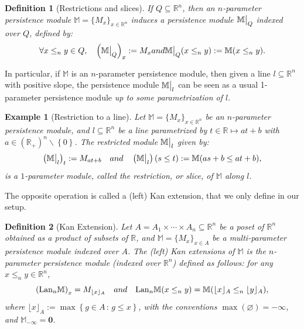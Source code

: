 \documentclass{article}
\newcommand{\R}{\mathbb{R}}
\newcommand{\Mbb}{\mathbb{M}}
\newcommand{\leqn}{\leq_n}
\newcommand\restr[2]{{  \left.\kern-\nulldelimiterspace #1 \vphantom{\big|} \right|_{#2}  }}
\newtheorem{example}{Example}%
\newtheorem{definition}{Definition}%
\newcommand{\rebuttal}[1]{{ #1}}
\begin{document}
\rebuttal{
	\begin{definition}[Restrictions and slices]\label{remark:restrictions_and_slices}
		If  $Q\subseteq \R^n$, then an $n$-parameter persistence module $\Mbb=\{M_x\}_{x\in\R^n}$ induces a persistence module $\restr \Mbb Q$ indexed over $Q$, defined by:
		\begin{equation*}
			\forall x\leqn y \in Q, \quad \left(\restr \Mbb {Q}\right)_x := M_x \textnormal{
			and } \restr \Mbb Q (x \leqn y) := \Mbb(x\leqn y).
		\end{equation*}
	\end{definition}

	In particular, if $\Mbb$ is an $n$-parameter persistence module, then given a
	line $l\subseteq \R^n$ with positive slope, the persistence module $\restr \Mbb l$ can be seen as a usual 1-parameter persistence module \emph{up to some parametrization of $l$}.
	\\

	\begin{example}[Restriction to a line]\label{ex:restr_line_mp}
		Let $\Mbb=\{M_x\}_{x\in\R^n}$ be an $n$-parameter persistence module, and $l\subseteq \R^n$ be a line
		parametrized by $t\in \R\mapsto at+b$ with $a\in (\R_+)^n
		\backslash \left\{ 0 \right\} $.
		The restricted module $\restr \Mbb l$ given by:
		\begin{equation}
			\left( \restr \Mbb l \right) _t := M_{at+b} \quad \textnormal{and }\quad
			\left( \restr \Mbb l \right)(s\le t) := \Mbb(as+b \le at+b),
		\end{equation}
		is a $1$-parameter module, called the {\em restriction, or slice, of $\Mbb$ along $l$}.  \\
	\end{example}

	The opposite operation is called a (left) Kan extension, that we only define in
	our setup. \\

	\begin{definition}[Kan Extension]\label{def:kan_extension}
		Let $A = A_1\times \cdots \times A_n \subseteq \R^n$ be a poset of $\R^n$ obtained as a
		product of subsets of $\R$, and $\Mbb=\{M_x\}_{x\in A}$ be a multi-parameter persistence module indexed over $A$.
		The \emph{(left) Kan extensions} of $\Mbb$  is the
		$n$-parameter persistence module (indexed over $\R^n$)
		defined as follows:
		for any $x\leqn y \in \R^n$,
		\begin{equation}
			\left( \mathrm{Lan}_n \Mbb \right)_x = M_{\lfloor x\rfloor_A}
			\quad
			\textnormal{and}
			\quad
			\mathrm{Lan}_n \Mbb (x\leqn y) = \Mbb(\lfloor x\rfloor_A\leqn \lfloor y\rfloor_A),
		\end{equation}
		where $\lfloor x \rfloor_A := \max \left\{ g\in A \,:\, g \le x \right\} $, with the conventions $\max (\varnothing) = -\boldsymbol \infty$, and $\Mbb_{-\boldsymbol\infty} = \boldsymbol 0$.
		\\
	\end{definition}

}
\end{document}
